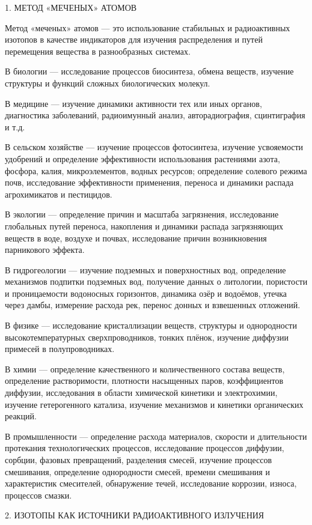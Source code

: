 \documentclass[a5paper,openany]{book}
\begin{document}
1. МЕТОД «МЕЧЕНЫХ» АТОМОВ

Метод «меченых» атомов — это использование стабильных и радиоактивных изотопов в качестве индикаторов для изучения распределения и путей перемещения вещества в разнообразных системах.

В биологии — исследование процессов биосинтеза, обмена веществ, изучение структуры и функций сложных биологических молекул.

В медицине — изучение динамики активности тех или иных органов, диагностика заболеваний, радиоимунный анализ, авторадиография, сцинтиграфия и т.д.

В сельском хозяйстве — изучение процессов фотосинтеза, изучение усвояемости удобрений и определение эффективности использования растениями азота, фосфора, калия, микроэлементов, водных ресурсов; определение солевого режима почв, исследование эффективности применения, переноса и динамики распада агрохимикатов и пестицидов.

В экологии — определение причин и масштаба загрязнения, исследование глобальных путей переноса, накопления и динамики распада загрязняющих веществ в воде, воздухе и почвах, исследование причин возникновения парникового эффекта.

В гидрогеологии — изучение подземных и поверхностных вод, определение механизмов подпитки подземных вод, получение данных о литологии, пористости и проницаемости водоносных горизонтов, динамика озёр и водоёмов, утечка через дамбы, измерение расхода рек, перенос донных и взвешенных отложений.

В физике — исследование кристаллизации веществ, структуры и однородности высокотемпературных сверхпроводников, тонких плёнок, изучение диффузии примесей в полупроводниках.

В химии — определение качественного и количественного состава веществ, определение растворимости, плотности насыщенных паров, коэффициентов диффузии, исследования в области химической кинетики и электрохимии, изучение гетерогенного катализа, изучение механизмов и кинетики органических реакций.

В промышленности — определение расхода материалов, скорости и длительности протекания технологических процессов, исследование процессов диффузии, сорбции, фазовых превращений, разделения смесей, изучение процессов смешивания, определение однородности смесей, времени смешивания и характеристик смесителей, обнаружение течей, исследование коррозии, износа, процессов смазки.

2. ИЗОТОПЫ КАК ИСТОЧНИКИ РАДИОАКТИВНОГО ИЗЛУЧЕНИЯ
\end{document}
